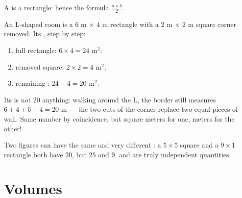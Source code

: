 \begin{omfigure}

{\small A  is  a rectangle: hence the formula
$\frac{a\times b}{2}$.}
\end{omfigure}

\begin{example}\label{ex:g6:measure:composite}
An L-shaped room is a $6$ m $\times$ $4$ m rectangle with a $2$ m
$\times$ $2$ m square corner removed. Its , step by step:
\begin{enumerate}
  \item full rectangle: $6 \times 4 = 24$ m$^2$;
  \item removed square: $2 \times 2 = 4$ m$^2$;
  \item remaining : $24 - 4 = 20$ m$^2$.
\end{enumerate}
Its \emph{} is not $20$ anything: walking around the L, the
border still measures $6 + 4 + 6 + 4 = 20$ m --- the two cuts of the
corner replace two equal pieces of wall. Same number by coincidence,
but square meters for one, meters for the other!
\end{example}

\begin{remark}
Two figures can have the same  and very different : a
$5 \times 5$ square and a $9 \times 1$ rectangle both have 
$20$, but  $25$ and $9$.  and  are truly independent
quantities.
\end{remark}

\section{Volumes}

